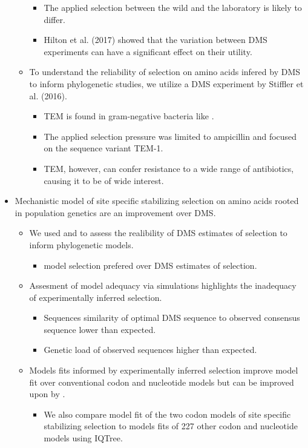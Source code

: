 \documentclass[12pt]{article}
\begin{document}
\begin{itemize}
\begin{itemize}
\begin{itemize}
			\item The applied selection between the wild and the laboratory is likely to differ.
			\item Hilton et al. (2017) showed that the variation between DMS experiments can have a significant effect on their utility.
		\end{itemize}
		\item To understand the reliability of selection on amino acids infered by DMS to inform phylogenetic studies, we utilize a DMS experiment by Stiffler et al. (2016).
		\begin{itemize}
			\item TEM is found in gram-negative bacteria like \ecoli.
			\item The applied selection pressure was limited to ampicillin and focused on the sequence variant TEM-1.
			\item TEM, however, can confer resistance to a wide range of antibiotics, causing it to be of wide interest.
		\end{itemize}
	\end{itemize}
	\item Mechanistic model of site specific stabilizing selection on amino acids rooted in population genetics are an improvement over DMS.
	\begin{itemize}
		\item We used \phydms and \selac to assess the realibility of DMS estimates of selection to inform phylogenetic models.
		\begin{itemize}
			\item model selection prefered \selac over DMS estimates of selection.
		\end{itemize}
		\item Assesment of model adequacy via simulations highlights the inadequacy of experimentally inferred selection.
		\begin{itemize}
			\item Sequences similarity of optimal DMS sequence to observed consensus sequence lower than expected.
			\item Genetic load of observed sequences higher than expected.
		\end{itemize}
		\item Models fits informed by experimentally inferred selection improve model fit over conventional codon and nucleotide models but can be improved upon by \selac.
		\begin{itemize}
			\item We also compare model fit of the two codon models of site specific stabilizing selection to models fits of 227 other codon and nucleotide models using IQTree.
		\end{itemize}
	\end{itemize}
\end{itemize}
\end{document}
